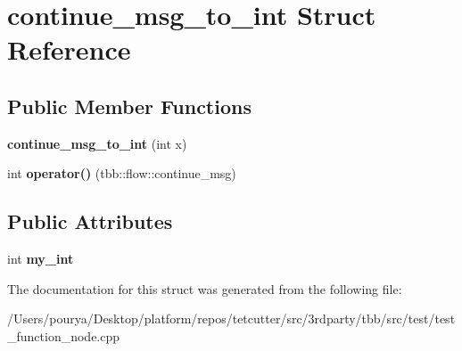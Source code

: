 \hypertarget{structcontinue__msg__to__int}{}\section{continue\+\_\+msg\+\_\+to\+\_\+int Struct Reference}
\label{structcontinue__msg__to__int}
\subsection*{Public Member Functions}
\begin{DoxyCompactItemize}
\item 
\hypertarget{structcontinue__msg__to__int_af962b9cdee822efd1c8ed68265e67166}{}{\bfseries continue\+\_\+msg\+\_\+to\+\_\+int} (int x)\label{structcontinue__msg__to__int_af962b9cdee822efd1c8ed68265e67166}

\item 
\hypertarget{structcontinue__msg__to__int_ab427dc470d773d7e2884f07142c8b09f}{}int {\bfseries operator()} (tbb\+::flow\+::continue\+\_\+msg)\label{structcontinue__msg__to__int_ab427dc470d773d7e2884f07142c8b09f}

\end{DoxyCompactItemize}
\subsection*{Public Attributes}
\begin{DoxyCompactItemize}
\item 
\hypertarget{structcontinue__msg__to__int_ae49e00c939843d94cc338ee1e5c8d652}{}int {\bfseries my\+\_\+int}\label{structcontinue__msg__to__int_ae49e00c939843d94cc338ee1e5c8d652}

\end{DoxyCompactItemize}


The documentation for this struct was generated from the following file\+:\begin{DoxyCompactItemize}
\item 
/\+Users/pourya/\+Desktop/platform/repos/tetcutter/src/3rdparty/tbb/src/test/test\+\_\+function\+\_\+node.\+cpp\end{DoxyCompactItemize}
